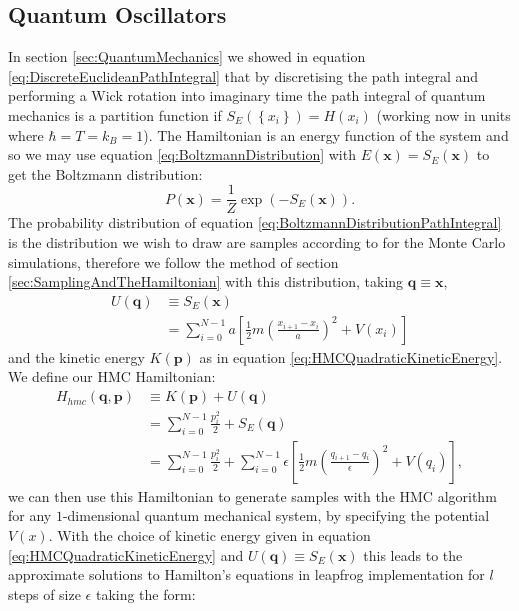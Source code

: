 \documentclass[12pt]{article}
\begin{document}
    \subsection{Quantum Oscillators}
    In section \ref{sec:QuantumMechanics} we showed in equation \ref{eq:DiscreteEuclideanPathIntegral} that by discretising the path integral and performing a Wick rotation into imaginary time the path integral of quantum mechanics is a partition function if $S_E\left(\left\{x_i\right\}\right)= H\left(x_i\right)$ (working now in units where $\hbar=T=k_B=1$). The Hamiltonian is an energy function of the system and so we may use equation \ref{eq:BoltzmannDistribution} with $E\left(\bm{x}\right) = S_E\left(\bm{x}\right)$ to get the Boltzmann distribution:
    \begin{equation}
        \label{eq:BoltzmannDistributionPathIntegral}
        P\left(\bm{x}\right) = \frac{1}{Z}\exp{\left(-S_E\left(\bm{x}\right)\right)}.
    \end{equation}
    The probability distribution of equation \ref{eq:BoltzmannDistributionPathIntegral} is the distribution we wish to draw are samples according to for the Monte Carlo simulations, therefore we follow the method of section \ref{sec:SamplingAndTheHamiltonian} with this distribution, taking $\bm{q}\equiv\bm{x}$,
    \begin{align}
        \label{eq:QuantumHMCPotential}
        U\left(\bm{q}\right) & \equiv S_E\left(\bm{x}\right) \\
                             & = \sum_{i=0}^{N-1} a \left[\frac{1}{2}m\left(\frac{x_{i+1}-x_{i}}{a}\right)^2 + V(x_i)\right]
    \end{align} 
    and the kinetic energy $K\left(\bm{p}\right)$ as in equation \ref{eq:HMCQuadraticKineticEnergy}. We define our HMC Hamiltonian:
    \begin{align}
        \label{eq:HMCQuantumMechanicalHamiltonian1}
        H_{hmc}\left(\bm{q},\bm{p}\right) & \equiv K\left(\bm{p}\right) + U\left(\bm{q}\right)\\
        \label{eq:HMCQuantumMechanicalHamiltonian2} & = \sum_{i=0}^{N-1} \frac{p_i^2}{2} + S_E\left(\bm{q}\right) \\
        \label{eq:HMCQuantumMechanicalHamiltonian3}& = \sum_{i=0}^{N-1} \frac{p_i^2}{2} + \sum_{i=0}^{N-1} \epsilon \left[\frac{1}{2}m\left(\frac{q_{i+1}-q_{i}}{\epsilon}\right)^2 + V\left(q_i\right)\right],
    \end{align} 
    we can then use this Hamiltonian to generate samples with the HMC algorithm for any $1$-dimensional quantum mechanical system, by specifying the potential $V\left(x\right)$. With the choice of kinetic energy given in equation \ref{eq:HMCQuadraticKineticEnergy} and $U\left(\bm{q}\right) \equiv S_E\left(\bm{x}\right)$ this leads to the approximate solutions to Hamilton's equations in leapfrog implementation for $l$ steps of size $\epsilon$ taking the form:
\end{document}
